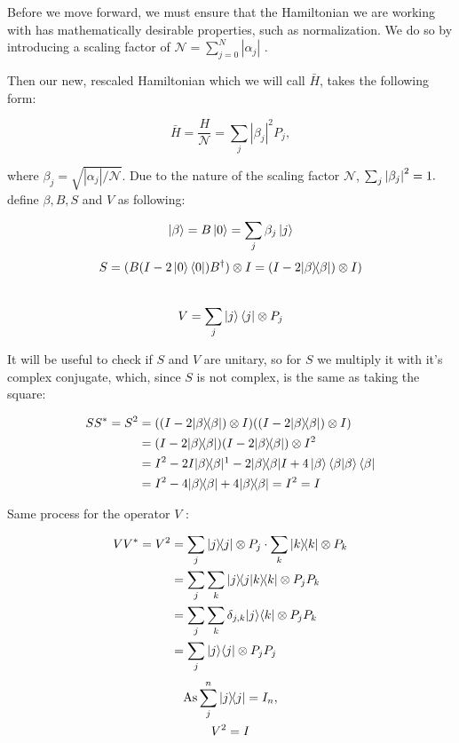 Before we move forward, we must ensure that the Hamiltonian we are working with has mathematically desirable properties, such as normalization. We do so by introducing a scaling factor of $\mathcal{N} = \sum_{j=0}^N |\alpha_j|$ \cite{poulin}.

Then our new, rescaled Hamiltonian which we will call $\bar{H}$, takes the following form:

\begin{equation}
	\bar H = \frac H{\mathcal{N}} = \sum_j|\beta_j|^2 P_j,
\end{equation}

where $\beta_j = \sqrt{|\alpha_j|/\mathcal{N}}$. Due to the nature of the scaling factor $\mathcal{N}$, $\sum_j \abs{\beta_j}^2 = 1.$
\\\textcite{poulin} define $\beta, B, S$ and  $V$ as following:

$$
\left\vert{\beta}\right\rangle = B\left\vert{0}\right\rangle = \sum_j \beta_j \left\vert{j}\right\rangle$$
$$
S = (B (I - 2 \left\vert{0}\right\rangle\left\langle{0}\right\vert) B^{\dagger}) \otimes I= (I-2| \beta \rangle\!\langle \beta |) \otimes I)$$
\\
$$
V=\sum_{j}\left\vert{j}\right\rangle\left\langle{j}\right\vert \otimes P_{j}
$$

It will be useful to check if $S$ and $V$ are unitary, so for $S$ we multiply it with it's complex conjugate, which, since $S$ is not complex, is the same as taking the square:

\begin{align} \begin{split}
SS^* = S^2 &= ((I-2\kb \beta \beta) \otimes I)((I-2\kb \beta \beta) \otimes I)\\
&= (I-2\kb \beta \beta)(I-2\kb \beta \beta) \otimes I^2 \\
&= I^2 - 2I\kb \beta \beta\footnotemark - 2\kb \beta \beta I + 4 \ket{\beta} \bracket \beta \beta \bra \beta\\
&= I^2 - 4\kb \beta \beta + 4\kb \beta \beta = I^2 = I
\end{split} \end{align}



Same process for the operator $ V$  :

\begin{align} \begin{split}
VV^* = V^2 &= \sum_{j} | j \rangle\!\langle j | \otimes P_{j} \cdot \sum_{k} | k \rangle\!\langle k | \otimes P_{k} \\
&= \sum_j \sum_k |j \rangle\!\langle j | k \rangle\!\langle k | \otimes P_j P_k\\
&= \sum_j \sum_k \delta_{j,k} | j \rangle \langle k | \otimes P_j P_k\\
&= \sum_j | j \rangle \langle j | \otimes P_j P_j\\
\end{split} \end{align}
\begin{gather*}
\text{As}  \sum_{j}^{n} | j \rangle\!\langle j | = I_n, \\
V^2 = I
\end{gather*}

